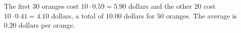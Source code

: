 The first $30$ oranges cost $10\cdot0.59=5.90$ dollars and the other $20$ cost $10\cdot0.41=4.10$ dollars, a total of $10.00$ dollars for $50$ oranges. The average is $\boxed{0.20\text{ dollars}}$ per orange.
